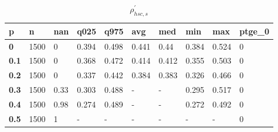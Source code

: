 \begin{table}[h]
 \centering 
\footnotesize
\caption{$\rho_{hsc,s}^\prime $}
\label{tab:alphahscs}
\begin{tabular}[h]{|l|l|l|l|l|l|l|l|l|l|
    } \hline
\textbf{ p} & \textbf{ n} & \textbf{ nan} & \textbf{ q025} & \textbf{ q975} & \textbf{ avg} & \textbf{ med} & \textbf{ min} & \textbf{ max} & \textbf{ ptge\_0}
    \\ \hline
  \textbf{  0} & 1500 &    0 & 0.394 & 0.498 & 0.441 &  0.44 & 0.384 & 0.524 & 0
    \\ \hline
  \textbf{0.1} & 1500 &    0 & 0.368 & 0.472 & 0.414 & 0.412 & 0.355 & 0.503 & 0
    \\ \hline
  \textbf{0.2} & 1500 &    0 & 0.337 & 0.442 & 0.384 & 0.383 & 0.326 & 0.466 & 0
    \\ \hline
  \textbf{0.3} & 1500 & 0.33 & 0.303 & 0.488 & - & - & 0.295 & 0.517 & 0
    \\ \hline
  \textbf{0.4} & 1500 & 0.98 & 0.274 & 0.489 & - & - & 0.272 & 0.492 & 0
    \\ \hline
  \textbf{0.5} & 1500 &    1 & - & - & - & - & - & - & 0
    \\ \hline
 \end{tabular}
 \end{table}
